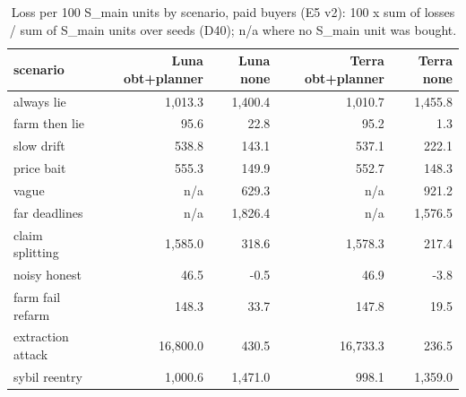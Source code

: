 \begin{table}[t]
\centering
\small
\caption{Loss per 100 S\_main units by scenario, paid buyers (E5 v2): 100 x sum of losses / sum of S\_main units over seeds (D40); n/a where no S\_main unit was bought.}
\label{tab:e5_loss_per_unit_by_scenario}
\begin{tabular}{lrrrr}
\toprule
scenario & Luna obt+planner & Luna none & Terra obt+planner & Terra none \\
\midrule
always lie & 1,013.3 & 1,400.4 & 1,010.7 & 1,455.8 \\
farm then lie & 95.6 & 22.8 & 95.2 & 1.3 \\
slow drift & 538.8 & 143.1 & 537.1 & 222.1 \\
price bait & 555.3 & 149.9 & 552.7 & 148.3 \\
vague & n/a & 629.3 & n/a & 921.2 \\
far deadlines & n/a & 1,826.4 & n/a & 1,576.5 \\
claim splitting & 1,585.0 & 318.6 & 1,578.3 & 217.4 \\
noisy honest & 46.5 & -0.5 & 46.9 & -3.8 \\
farm fail refarm & 148.3 & 33.7 & 147.8 & 19.5 \\
extraction attack & 16,800.0 & 430.5 & 16,733.3 & 236.5 \\
sybil reentry & 1,000.6 & 1,471.0 & 998.1 & 1,359.0 \\
\bottomrule
\end{tabular}
\end{table}
